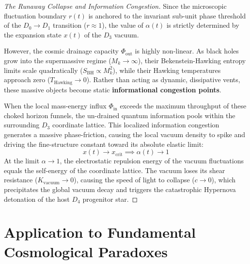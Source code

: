 \documentclass[11pt,a4paper]{article}
\theoremstyle{plain}
\theoremstyle{definition}
\theoremstyle{remark}
\begin{document}
\begin{proof}[The Runaway Collapse and Information Congestion]
Since the microscopic fluctuation boundary $r(t)$ is anchored to the invariant sub-unit phase threshold of the $D_0 \to D_1$ transition ($r \approx 1$), the value of $\alpha(t)$ is strictly determined by the expansion state $x(t)$ of the $D_3$ vacuum. 

However, the cosmic drainage capacity $\Phi_{\text{out}}$ is highly non-linear. As black holes grow into the supermassive regime ($M_k \to \infty$), their Bekenstein-Hawking entropy limits scale quadratically ($S_{\text{BH}} \propto M_k^2$), while their Hawking temperatures approach zero ($T_{\text{Hawking}} \to 0$). Rather than acting as dynamic, dissipative vents, these massive objects become static \textbf{informational congestion points}. 

When the local mass-energy influx $\Phi_{\text{in}}$ exceeds the maximum throughput of these choked horizon funnels, the un-drained quantum information pools within the surrounding $D_3$ coordinate lattice. This localized information congestion generates a massive phase-friction, causing the local vacuum density to spike and driving the fine-structure constant toward its absolute elastic limit:
\begin{equation}
x(t) \to x_{\text{crit}} \implies \alpha(t) \to 1
\end{equation}
At the limit $\alpha \to 1$, the electrostatic repulsion energy of the vacuum fluctuations equals the self-energy of the coordinate lattice. The vacuum loses its shear resistance ($K_{\text{vacuum}} \to 0$), causing the speed of light to collapse ($c \to 0$), which precipitates the global vacuum decay and triggers the catastrophic Hypernova detonation of the host $D_4$ progenitor star.
\end{proof}

\newpage 
\section{Application to Fundamental Cosmological Paradoxes} 
\end{document}
